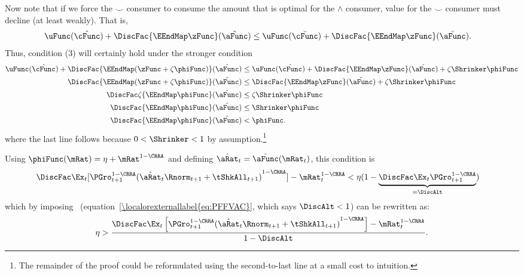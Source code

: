 \documentclass[\econtexRoot/BufferStockTheory]{subfiles}
\begin{document}
Now note that if we force the $\smile$ consumer to consume the amount that is
optimal for the $\wedge$ consumer, value for the $\smile$ consumer must decline (at least weakly).  That is,
\begin{align*}
\uFunc(\hat{\cFunc})+\DiscFac \{\EEndMap \zFunc \}(\hat{\aFunc})  & \leq \uFunc(\breve{\cFunc})+\DiscFac \{\EEndMap \zFunc \}(\breve{\aFunc})
.
\end{align*}
Thus, condition (3) will certainly hold under the stronger condition
\begin{align*}
\uFunc(\hat{\cFunc})+\DiscFac\{\EEndMap (\zFunc+\zeta \phiFunc) \}(\hat{\aFunc})  & \leq  \uFunc(\hat{\cFunc})+\DiscFac\{\EEndMap \zFunc \}(\hat{\aFunc})  + \zeta \Shrinker \phiFunc
\\ \DiscFac\{\EEndMap (\zFunc+\zeta \phiFunc) \}(\hat{\aFunc})  & \leq  \DiscFac\{\EEndMap \zFunc  \}(\hat{\aFunc})  + \zeta \Shrinker \phiFunc
\\ \DiscFac\zeta \{\EEndMap \phiFunc \}(\hat{\aFunc})  & \leq  \zeta \Shrinker \phiFunc
\\ \DiscFac\{\EEndMap \phiFunc \}(\hat{\aFunc})  & \leq  \Shrinker \phiFunc
\\ \DiscFac\{\EEndMap \phiFunc \}(\hat{\aFunc})   & < \phiFunc %
.
\end{align*}
where the last line follows because $0 < \Shrinker < 1$ by assumption.\footnote{The remainder of the proof could be reformulated using the second-to-last line at a small cost to intuition.}

Using $\phiFunc(\mRat)= \eta + \mRat^{1-\CRRA}$
and defining $\hat{\aRat}_{t}=\hat{\aFunc}(\mRat_{t})$, this condition is
\begin{align*}
\DiscFac \Ex_{t}[{\PGro}_{t+1}^{1-\CRRA}{(\hat{\aRat}_{t}\Rnorm_{t+1}+\tShkAll_{t+1})}^{1-\CRRA}]-\mRat_{t}^{1-\CRRA}  & < \eta(1-\underbrace{\DiscFac\Ex_{t}{\PGro}_{t+1}^{1-\CRRA}}_{=\DiscAlt})
\end{align*}
which by imposing \PFFVAC~(equation~\eqref{\localorexternallabel{eq:PFFVAC}}, which says $\DiscAlt<1$) can be rewritten as:
\begin{equation}\begin{gathered}\begin{aligned}
 \eta>\frac{\DiscFac \Ex_{t}\left[{\PGro}_{t+1}^{1-\CRRA}{(\hat{\aRat}_{t}\Rnorm_{t+1}+\tShkAll_{t+1})}^{1-\CRRA}\right]-\mRat_{t}^{1-\CRRA}}{1-\DiscAlt}\label{eq:KeyCondition}.
\end{aligned}\end{gathered}\end{equation}
\end{document}
